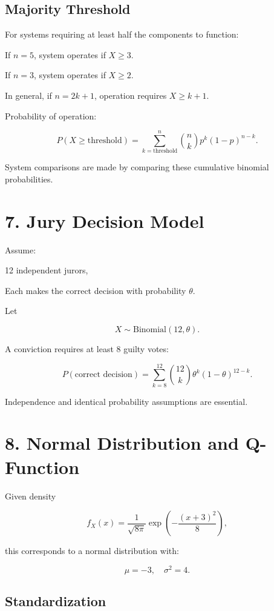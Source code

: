 \documentclass[12pt]{article}
\begin{document}
\subsection*{Majority Threshold}

For systems requiring at least half the components to function:

If $n = 5$, system operates if $X \ge 3$.

If $n = 3$, system operates if $X \ge 2$.

In general, if $n = 2k + 1$, operation requires $X \ge k + 1$.

Probability of operation:

\[
P(X \ge \text{threshold}) = \sum_{k=\text{threshold}}^{n} \binom{n}{k} p^k (1-p)^{n-k}.
\]

System comparisons are made by comparing these cumulative binomial probabilities.

\section*{7. Jury Decision Model}

Assume:

12 independent jurors,

Each makes the correct decision with probability $\theta$.

Let

\[
X \sim \text{Binomial}(12,\theta).
\]

A conviction requires at least 8 guilty votes:

\[
P(\text{correct decision}) = \sum_{k=8}^{12} \binom{12}{k} \theta^k (1-\theta)^{12-k}.
\]

Independence and identical probability assumptions are essential.

\section*{8. Normal Distribution and Q-Function}

Given density

\[
f_X(x) = \frac{1}{\sqrt{8\pi}} \exp\left(-\frac{(x+3)^2}{8}\right),
\]

this corresponds to a normal distribution with:

\[
\mu = -3, \quad \sigma^2 = 4.
\]

\subsection*{Standardization}
\end{document}
